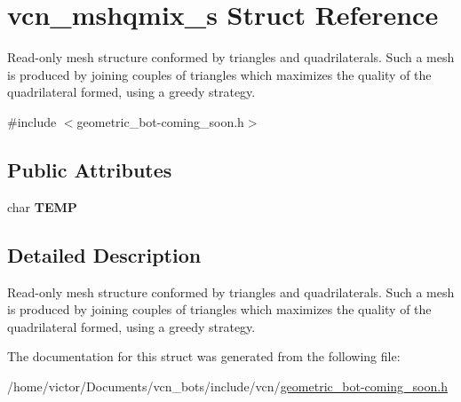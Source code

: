 \hypertarget{structvcn__mshqmix__s}{\section{vcn\+\_\+mshqmix\+\_\+s Struct Reference}
\label{structvcn__mshqmix__s}
}


Read-\/only mesh structure conformed by triangles and quadrilaterals. Such a mesh is produced by joining couples of triangles which maximizes the quality of the quadrilateral formed, using a greedy strategy.  




{\ttfamily \#include $<$geometric\+\_\+bot-\/coming\+\_\+soon.\+h$>$}

\subsection*{Public Attributes}
\begin{DoxyCompactItemize}
\item 
\hypertarget{structvcn__mshqmix__s_a87a21ac128a79de47b1145a2ef2cfff5}{char {\bfseries T\+E\+M\+P}}\label{structvcn__mshqmix__s_a87a21ac128a79de47b1145a2ef2cfff5}

\end{DoxyCompactItemize}


\subsection{Detailed Description}
Read-\/only mesh structure conformed by triangles and quadrilaterals. Such a mesh is produced by joining couples of triangles which maximizes the quality of the quadrilateral formed, using a greedy strategy. 

The documentation for this struct was generated from the following file\+:\begin{DoxyCompactItemize}
\item 
/home/victor/\+Documents/vcn\+\_\+bots/include/vcn/\hyperlink{geometric__bot-coming__soon_8h}{geometric\+\_\+bot-\/coming\+\_\+soon.\+h}\end{DoxyCompactItemize}
